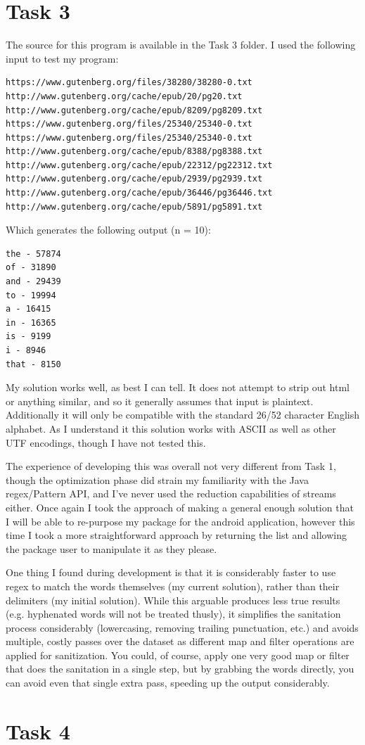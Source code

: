 \documentclass[11pt]{article}
\begin{document}
	\section{Task 3}
	The source for this program is available in the Task 3 folder. I used the following input to test my program:
\begin{verbatim}
https://www.gutenberg.org/files/38280/38280-0.txt
http://www.gutenberg.org/cache/epub/20/pg20.txt
http://www.gutenberg.org/cache/epub/8209/pg8209.txt
https://www.gutenberg.org/files/25340/25340-0.txt
https://www.gutenberg.org/files/25340/25340-0.txt
http://www.gutenberg.org/cache/epub/8388/pg8388.txt
http://www.gutenberg.org/cache/epub/22312/pg22312.txt
http://www.gutenberg.org/cache/epub/2939/pg2939.txt
http://www.gutenberg.org/cache/epub/36446/pg36446.txt
http://www.gutenberg.org/cache/epub/5891/pg5891.txt
\end{verbatim}
Which generates the following output (n = 10):
\begin{verbatim}
the - 57874
of - 31890
and - 29439
to - 19994
a - 16415
in - 16365
is - 9199
i - 8946
that - 8150
\end{verbatim}

My solution works well, as best I can tell. It does not attempt to strip out html or anything similar, and so it generally assumes that input is plaintext. Additionally it will only be compatible with the standard 26/52 character English alphabet. As I understand it this solution works with ASCII as well as other UTF encodings, though I have not tested this.

The experience of developing this was overall not very different from Task 1, though the optimization phase did strain my familiarity with the Java regex/Pattern API, and I've never used the reduction capabilities of streams either. Once again I took the approach of making a general enough solution that I will be able to re-purpose my package for the android application, however this time I took a more straightforward approach by returning the list and allowing the package user to manipulate it as they please.

One thing I found during development is that it is considerably faster to use regex to match the words themselves (my current solution), rather than their delimiters (my initial solution). While this arguable produces less true results (e.g. hyphenated words will not be treated thusly), it simplifies the sanitation process considerably (lowercasing, removing trailing punctuation, etc.) and avoids multiple, costly passes over the dataset as different map and filter operations are applied for sanitization. You could, of course, apply one very good map or filter that does the sanitation in a single step, but by grabbing the words directly, you can avoid even that single extra pass, speeding up the output considerably.

\section{Task 4}
\end{document}
